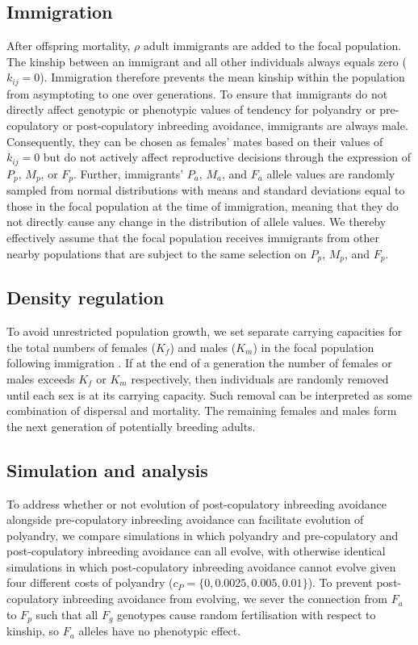\documentclass[10pt,letterpaper]{article}
\begin{document}
\subsection*{Immigration}

After offspring mortality, $\rho$ adult immigrants are added to the focal population. The kinship between an immigrant and all other individuals always equals zero ($k_{ij}=0$). Immigration therefore prevents the mean kinship within the population from asymptoting to one over generations. To ensure that immigrants do not directly affect genotypic or phenotypic values of tendency for polyandry or pre-copulatory or post-copulatory inbreeding avoidance, immigrants are always male. Consequently, they can be chosen as females' mates based on their values of $k_{ij}=0$ but do not actively affect reproductive decisions through the expression of $P_{p}$, $M_{p}$, or $F_{p}$. Further, immigrants' $P_{a}$, $M_{a}$, and $F_{a}$ allele values are randomly sampled from normal distributions with means and standard deviations equal to those in the focal population at the time of immigration, meaning that they do not directly cause any change in the distribution of allele values. We thereby effectively assume that the focal population receives immigrants from other nearby populations that are subject to the same selection on $P_{p}$, $M_{p}$, and $F_{p}$.

\subsection*{Density regulation}

To avoid unrestricted population growth, we set separate carrying capacities for the total numbers of females ($K_{f}$) and males ($K_{m}$) in the focal population following immigration \cite[][]{Guillaume2009, Duthie}. If at the end of a generation the number of females or males exceeds $K_{f}$ or $K_{m}$  respectively, then individuals are randomly removed until each sex is at its carrying capacity. Such removal can be interpreted as some combination of dispersal and mortality. The remaining females and males form the next generation of potentially breeding adults.

\subsection*{Simulation and analysis}

To address whether or not evolution of post-copulatory inbreeding avoidance alongside pre-copulatory inbreeding avoidance can facilitate evolution of polyandry, we compare simulations in which polyandry and pre-copulatory and post-copulatory inbreeding avoidance can all evolve, with otherwise identical simulations in which post-copulatory inbreeding avoidance cannot evolve given four different costs of polyandry ($c_{P} = \{0, 0.0025, 0.005,  0.01\}$). To prevent post-copulatory inbreeding avoidance from evolving, we sever the connection from $F_{a}$ to $F_{p}$ such that all $F_{g}$ genotypes cause random fertilisation with respect to kinship, so $F_{a}$ alleles have no phenotypic effect.
\end{document}
